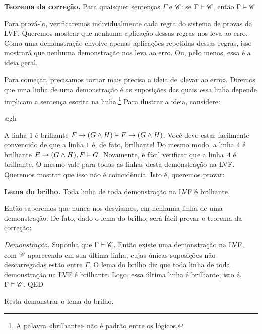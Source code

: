\begin{factoidboxe}\textbf{Teorema da correção.} Para quaisquer sentenças $\Gamma$ e $\mathscr{C}$: se $\Gamma\vdash\mathscr{C}$, então $\Gamma \vDash\mathscr{C}$
\end{factoidboxe}

Para prová-lo, verificaremos individualmente cada regra do sistema de provas da LVF. Queremos mostrar que nenhuma aplicação dessas regras nos leva ao erro. Como uma demonstração envolve apenas aplicações repetidas dessas regras, isso mostrará que nenhuma demonstração nos leva ao erro. Ou, pelo menos, essa é a ideia geral.

Para começar, precisamos tornar mais precisa a ideia de «levar ao erro». Diremos que uma linha de uma demonstração é  \emph{\ifeff} as suposições das quais essa linha depende implicam a sentença escrita na linha.\footnote{A palavra «brilhante» não é padrão entre os lógicos.} Para ilustrar a ideia, considere:
	\begin{fitchproof}
		\PR
		\open
			\AS
			\ae{gh}
		\close
	\end{fitchproof}\noindent\noindent
A linha $1$ é brilhante \emph{\ifeff} $F \rightarrow (G \wedge H) \vDash F \rightarrow (G \wedge H)$. Você deve estar facilmente convencido de que a linha $1$ é, de fato, brilhante! Do mesmo modo, a linha $4$ é brilhante \emph{\ifeff} $F \rightarrow (G \wedge H), F \vDash G$. Novamente, é fácil verificar que a linha~$4$ é brilhante. O mesmo vale para todas as linhas desta demonstração na LVF. Queremos mostrar que isso não é coincidência. Isto é, queremos provar:
	\begin{factoidboxe}\textbf{Lema do brilho.}
		Toda linha de toda demonstração na LVF é brilhante.
	\end{factoidboxe}\noindent
Então saberemos que nunca nos desviamos, em nenhuma linha de uma demonstração. De fato, dado o lema do brilho, será fácil provar o teorema da correção:

\emph{Demonstração.} Suponha que $\Gamma \vdash \mathscr{C}$. Então existe uma demonstração na LVF, com $\mathscr{C}$ aparecendo em sua última linha, cujas únicas suposições não descarregadas estão entre $\Gamma$. O lema do brilho diz que toda linha de toda demonstração na LVF é brilhante. Logo, essa última linha é brilhante, isto é, $\Gamma \vDash \mathscr{C}$. QED

Resta demonstrar o lema do brilho.

